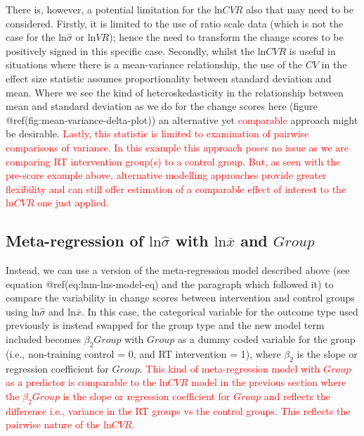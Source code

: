 \documentclass[
]{article}
\begin{document}
There is, however, a potential limitation for the \(\textrm{ln}CVR\) also that may need to be considered. Firstly, it is limited to the use of ratio scale data (which is not the case for the \(\textrm{ln}\hat\sigma\) or \(\textrm{ln}VR\)); hence the need to transform the change scores to be positively signed in this specific case. Secondly, whilst the \(\textrm{ln}CVR\) is useful in situations where there is a mean-variance relationship, the use of the \(CV\) in the effect size statistic assumes proportionality between standard deviation and mean. Where we see the kind of heteroskedasticity in the relationship between mean and standard deviation as we do for the change scores here (figure @ref(fig:mean-variance-delta-plot)) an alternative yet \textcolor{red}{comparable} approach might be desirable. \textcolor{red}{Lastly, this statistic is limited to examination of pairwise comparisons of variance. In this example this approach poses no issue as we are comparing RT intervention group(s) to a control group. But, as seen with the pre-score example above, alternative modelling approaches provide greater flexibility and can still offer estimation of a \textcolor{red}{comparable} effect of interest to the $\textrm{ln}CVR$ one just applied.}

\hypertarget{meta-regression-of-textrmlnhatsigma-with-textrmlnoverlinex-and-group}{%
\subsection{\texorpdfstring{Meta-regression of \(\textrm{ln}\hat\sigma\) with \(\textrm{ln}\overline{x}\) and \(Group\)}{Meta-regression of \textbackslash textrm\{ln\}\textbackslash hat\textbackslash sigma with \textbackslash textrm\{ln\}\textbackslash overline\{x\} and Group}}\label{meta-regression-of-textrmlnhatsigma-with-textrmlnoverlinex-and-group}}

Instead, we can use a version of the meta-regression model described above (see equation @ref(eq:lnm-lns-model-eq) and the paragraph which followed it) to compare the variability in change scores between intervention and control groups using \(\textrm{ln}\hat\sigma\) and \(\textrm{ln}\overline{x}\). In this case, the categorical variable for the outcome type used previously is instead swapped for the group type and the new model term included becomes \(\beta_{2}Group\) with \(Group\) as a dummy coded variable for the group (i.e., non-training control = 0, and RT intervention = 1), where \(\beta_{2}\) is the slope or regression coefficient for \(Group\). \textcolor{red}{This kind of meta-regression model with  $Group$ as a predictor is comparable to the $\textrm{ln}CVR$ model in the previous section where the $\beta_{2}Group$ is the slope or regression coefficient for $Group$ and reflects the difference i.e., variance in the RT groups vs the control groups. This reflects the pairwise nature of the $\textrm{ln}CVR$.}
\end{document}
